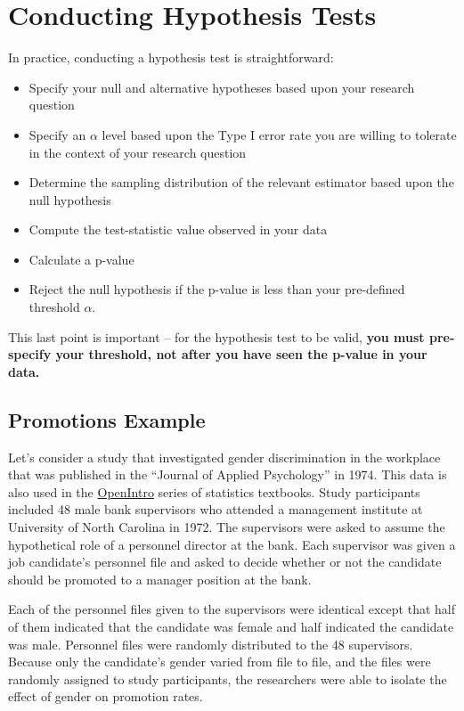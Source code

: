 \documentclass[
  letterpaper,
  DIV=11,
  numbers=noendperiod]{scrreprt}
\providecommand{\tightlist}{%
  \setlength{\itemsep}{0pt}\setlength{\parskip}{0pt}}\usepackage{longtable,booktabs,array}
\theoremstyle{definition}
\theoremstyle{remark}
\begin{document}
\hypertarget{sec-two-tailed}{%
\section{Conducting Hypothesis Tests}\label{sec-two-tailed}}

In practice, conducting a hypothesis test is straightforward:

\begin{itemize}
\tightlist
\item
  Specify your null and alternative hypotheses based upon your research
  question
\item
  Specify an \(\alpha\) level based upon the Type I error rate you are
  willing to tolerate in the context of your research question
\item
  Determine the sampling distribution of the relevant estimator based
  upon the null hypothesis
\item
  Compute the test-statistic value observed in your data
\item
  Calculate a p-value
\item
  Reject the null hypothesis if the p-value is less than your
  pre-defined threshold \(\alpha\).
\end{itemize}

This last point is important -- for the hypothesis test to be valid,
\textbf{you must pre-specify your threshold, not after you have seen the
p-value in your data.}

\hypertarget{sec-ht-activity}{%
\subsection{Promotions Example}\label{sec-ht-activity}}

Let's consider a study that investigated gender discrimination in the
workplace that was published in the ``Journal of Applied Psychology'' in
1974. This data is also used in the
\href{https://www.openintro.org/}{OpenIntro} series of statistics
textbooks. Study participants included 48 male bank supervisors who
attended a management institute at University of North Carolina in 1972.
The supervisors were asked to assume the hypothetical role of a
personnel director at the bank. Each supervisor was given a job
candidate's personnel file and asked to decide whether or not the
candidate should be promoted to a manager position at the bank.

Each of the personnel files given to the supervisors were identical
except that half of them indicated that the candidate was female and
half indicated the candidate was male. Personnel files were randomly
distributed to the 48 supervisors. Because only the candidate's gender
varied from file to file, and the files were randomly assigned to study
participants, the researchers were able to isolate the effect of gender
on promotion rates.
\end{document}
